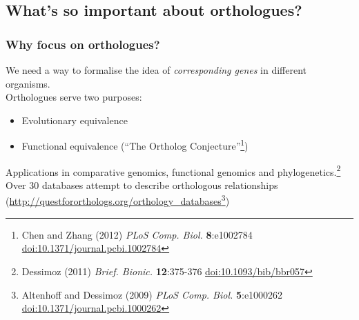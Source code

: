 
\subsection{What's so important about orthologues?}

\begin{frame}
  \frametitle{Why focus on orthologues?}
  We need a way to formalise the idea of \textit{corresponding genes} in different organisms. \\
  Orthologues serve two purposes:
  \begin{itemize}
    \item Evolutionary equivalence
    \item Functional equivalence (``The Ortholog Conjecture''\footnote{\tiny{Chen and Zhang (2012) \textit{PLoS Comp. Biol.} \textbf{8}:e1002784 \href{http://dx.doi.org/10.1371/journal.pcbi.1002784}{doi:10.1371/journal.pcbi.1002784}}})
  \end{itemize}
  Applications in comparative genomics, functional genomics and phylogenetics.\footnote{\tiny{Dessimoz (2011) \textit{Brief. Bionic.} \textbf{12}:375-376 \href{http://dx.doi.org/10.1093/bib/bbr057}{doi:10.1093/bib/bbr057}}} \\
  Over 30 databases attempt to describe orthologous relationships (\href{http://questfororthologs.org/orthology_databases
}{http://questfororthologs.org/orthology\_databases}\footnote{\tiny{Altenhoff and Dessimoz (2009) \textit{PLoS Comp. Biol.} \textbf{5}:e1000262 \href{http://dx.doi.org/10.1371/journal.pcbi.1000262}{doi:10.1371/journal.pcbi.1000262}}})
\end{frame}

